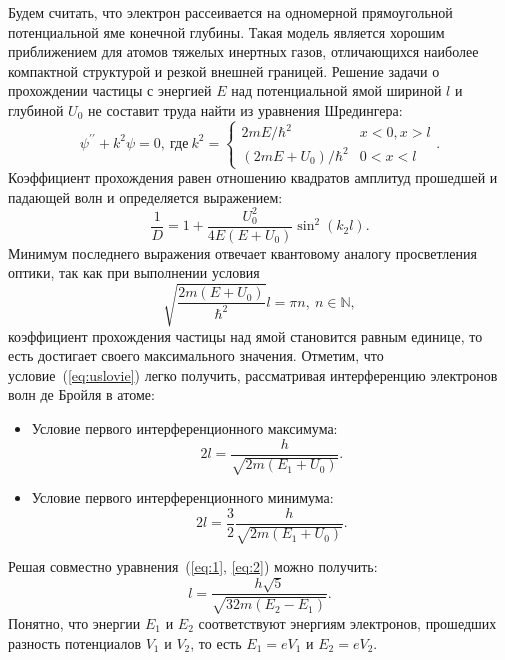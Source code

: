 \documentclass[%
 reprint,
 amsmath,amssymb,
 aps,
]{revtex4-2}
\begin{document}
Будем считать, что электрон рассеивается на одномерной прямоугольной потенциальной яме конечной глубины. Такая модель является хорошим приближением для атомов тяжелых инертных газов, отличающихся наиболее компактной структурой и резкой внешней границей. Решение задачи о прохождении частицы с энергией $E$ над потенциальной ямой шириной $l$ и глубиной $U_0$ не составит труда найти из уравнения Шредингера:\\
\begin{equation*}
\psi^{\prime\prime}+k^2\psi=0, \ \text{где}\
k^2 =\begin{cases}
2mE/\hbar^2 & x<0, x>l\\
(2mE+U_0)/\hbar^2 & 0<x<l
\end{cases}.
\end{equation*}
Коэффициент прохождения равен отношению квадратов амплитуд прошедшей и падающей волн и определяется выражением:
\begin{equation*}
\frac{1}{D} = 1 + \frac{U_0^2}{4E(E+U_0)}\sin^2(k_2l).
\end{equation*}
Минимум последнего выражения отвечает квантовому аналогу просветления оптики, так как при выполнении условия
\begin{equation*}
\tag{$\star$}
\label{eq:uslovie}
\sqrt{\frac{2m(E+U_0)}{\hbar^2}}l = \pi n, \ n\in\mathbb{N},
\end{equation*}
коэффициент прохождения частицы над ямой становится равным единице, то есть достигает своего максимального значения.
Отметим, что условие~(\ref{eq:uslovie}) легко получить, рассматривая интерференцию электронов волн де Бройля в атоме:\\
\begin{itemize}
	\item
	Условие первого интерференционного максимума:
	\begin{equation}
	\label{eq:1}
	2l = \frac{h}{\sqrt{2m(E_1+U_0)}}.
	\end{equation}
	\item
	Условие первого интерференционного минимума:
	\begin{equation}
	\label{eq:2}
	2l =\frac{3}{2} \frac{h}{\sqrt{2m(E_1+U_0)}}.
	\end{equation}			
\end{itemize}

Решая совместно уравнения~(\ref{eq:1}, \ref{eq:2}) можно получить:
\begin{equation}
\label{eq:l}
l = \frac{h\sqrt{5}}{\sqrt{32m(E_2-E_1)}}.
\end{equation}
Понятно, что энергии $E_1$ и $E_2$ соответствуют энергиям электронов, прошедших разность потенциалов $V_1$ и $V_2$, то есть $E_1 = eV_1$ и $E_2 = eV_2$. 
\end{document}
